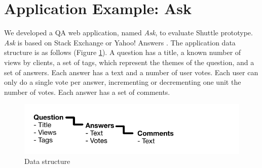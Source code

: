 \section{Application Example: Ask}\label{sec:impl:application}
We developed a \acf{QA} web application, named \emph{Ask}, to evaluate Shuttle prototype. \emph{Ask} is based on Stack Exchange \cite{stackexchange} or Yahoo! Answers \cite{yahooAnswers}. The application data structure is as follows (Figure \ref{fig:DataStructure}). A question has a title, a known number of views by clients, a set of tags, which represent the themes of the question, and a set of answers. Each answer has a text and a number of user votes. Each user can only do a single vote per answer, incrementing or decrementing one unit the number of votes. Each answer has a set of comments.

 \begin{figure}
   \centering
   \includegraphics{images/questionStructure}
   \caption{Data structure}
   \label{fig:DataStructure}
 \end{figure}

